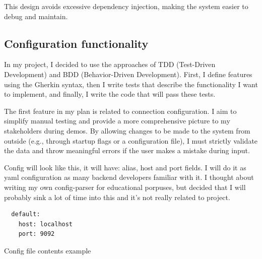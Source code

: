 \documentclass[10pt , a4paper]{report}
\newenvironment{code}{\captionsetup{type=listing}}{}
\begin{document}
This design avoids excessive dependency injection, making the system easier to debug and maintain.

\newpage
\subsection{Configuration functionality}

In my project, I decided to use the approaches of TDD (Test-Driven Development) and BDD (Behavior-Driven Development). First, I define features using the Gherkin syntax, then I write tests that describe the functionality I want to implement, and finally, I write the code that will pass these tests. 

The first feature in my plan is related to connection configuration. I aim to simplify manual testing and provide a more comprehensive picture to my stakeholders during demos. By allowing changes to be made to the system from outside (e.g., through startup flags or a configuration file), I must strictly validate the data and throw meaningful errors if the user makes a mistake during input.

Config will look like this, it will have: alias, host and port fields. I will do it as yaml configuration as many backend developers familiar with it. I thought about writing my own config-parser for educational porpuses, but decided that I will probably sink a lot of time into this and it's not really related to project. 

\begin{code}
  \begin{verbatim}
  default:
    host: localhost
    port: 9092
  \end{verbatim}
  \caption{Config file contents example}
\end{code}  
\end{document}
